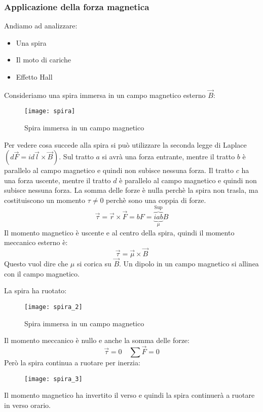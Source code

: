 \documentclass[a4paper]{article}
\begin{document}
\subsubsection{Applicazione della forza magnetica}
Andiamo ad analizzare:
\begin{itemize}
  \item Una spira
  \item Il moto di cariche
  \item Effetto Hall
\end{itemize}

\begin{example}
  Consideriamo una spira immersa in un campo magnetico esterno \( \vec{B} \):
  \begin{figure}[H]
    \centering
    \texttt{[image: spira]}
    \caption{Spira immersa in un campo magnetico}
  \end{figure}
  \noindent
  Per vedere cosa succede alla spira si può utilizzare la seconda legge di Laplace
  \( \left( d\vec{F} = i d\vec{l} \times \vec{B} \right) \).
  Sul tratto \( a \) si avrà una forza entrante, mentre il tratto \( b \) è parallelo
  al campo magnetico e quindi non subisce nessuna forza. Il tratto \( c \) ha una
  forza uscente, mentre il tratto \( d \) è parallelo al campo magnetico e quindi
  non subisce nessuna forza.
  La somma delle forze è nulla perchè la spira non trasla,
  ma costituiscono un momento \( \tau \neq 0 \) perchè sono una coppia di forze.
  \[
    \vec{\tau} = \vec{r} \times \vec{F} = bF = \overbrace{\underbrace{iab}_{\mu}}^{\text{Sup}}B
  \]
  Il momento magnetico è uscente e al centro della spira, quindi il momento meccanico
  esterno è: 
  \[
   \vec{\tau} = \vec{\mu} \times \vec{B}
  \] 
  Questo vuol dire che \( \mu \) si corica su \( \vec{B} \).
  Un dipolo in un campo magnetico si allinea con il campo magnetico.

  \vspace{1em}
  \noindent
  La spira ha ruotato:
  \begin{figure}[H]
    \centering
    \texttt{[image: spira\_2]}
    \caption{Spira immersa in un campo magnetico}
  \end{figure}
  \noindent
  Il momento meccanico è nullo e anche la somma delle forze:
  \[
    \vec{\tau} = 0 \quad \sum \vec{F} = 0
  \] 
  Però la spira continua a ruotare per inerzia:
  \begin{figure}[H]
    \centering
    \texttt{[image: spira\_3]}
  \end{figure}
  \noindent
  Il momento magnetico ha invertito il verso e quindi la spira continuerà a ruotare in
  verso orario.


\end{example}
\end{document}
